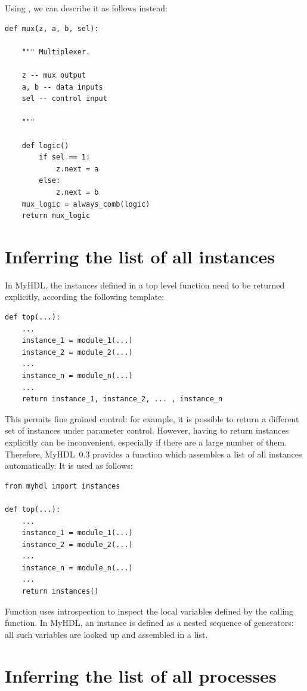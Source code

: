 \documentclass{howto}
\newcommand{\myhdl}{\protect \mbox{MyHDL}}
\begin{document}
Using , we can describe it as follows instead:

\begin{verbatim}
def mux(z, a, b, sel):

    """ Multiplexer.
    
    z -- mux output
    a, b -- data inputs
    sel -- control input

    """

    def logic()
        if sel == 1:
            z.next = a
        else:
            z.next = b
    mux_logic = always_comb(logic)
    return mux_logic
\end{verbatim}


\section{Inferring the list of all instances\label{section-instances}}

In \myhdl{}, the instances defined in a top level function
need to be returned explicitly, according
the following template:

\begin{verbatim}
def top(...):
    ...
    instance_1 = module_1(...)
    instance_2 = module_2(...)
    ...
    instance_n = module_n(...)
    ... 
    return instance_1, instance_2, ... , instance_n
\end{verbatim}


This permits fine grained control: for example, it
is possible to return a different set of instances
under parameter control. 
However, having to return instances explicitly can be inconvenient,
especially if there are a large number of them. Therefore, \myhdl\ 0.3
provides a function  which assembles a list of
all instances automatically. It is used as follows:

\begin{verbatim}
from myhdl import instances

def top(...):
    ...
    instance_1 = module_1(...)
    instance_2 = module_2(...)
    ...
    instance_n = module_n(...)
    ...
    return instances()
\end{verbatim}

Function  uses introspection to
inspect the local variables defined by the calling
function. In \myhdl {}, an instance is defined as
a nested sequence of generators: all such variables
are looked up and assembled in a list.

\section{Inferring the list of all processes\label{section-processes}}
\end{document}
